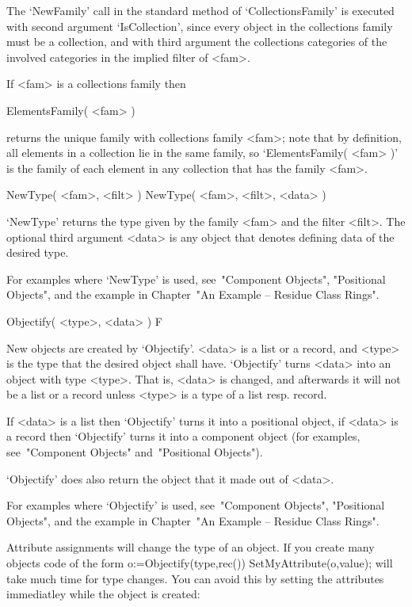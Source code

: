 The `NewFamily' call in the standard method of `CollectionsFamily'
is executed with second argument `IsCollection',
since every object in the collections family must be a collection,
and with third argument the collections categories of the involved
categories in the implied filter of <fam>.

If <fam> is a collections family then

\>ElementsFamily( <fam> )

returns the unique family with collections family <fam>;
note that by definition,
all elements in a collection lie in the same family,
so `ElementsFamily( <fam> )' is the family of each element
in any collection that has the family <fam>.



\>NewType( <fam>, <filt> )
\)NewType( <fam>, <filt>, <data> )

`NewType' returns the type given by the family <fam>
and the filter <filt>.
The optional third argument <data> is any object that denotes defining
data of the desired type.

For examples where `NewType' is used, see~"Component Objects",
"Positional Objects",
and the example in Chapter~"An Example -- Residue Class Rings".



\>Objectify( <type>, <data> ) F

New objects are created by `Objectify'.
<data> is a list or a record, and <type> is the type that the desired
object shall have.
`Objectify' turns <data> into an object with type <type>.
That is, <data> is changed, and afterwards it will not be a list or a
record unless <type> is a type of a list resp. record.

If <data> is a list then `Objectify' turns it into a positional object,
if <data> is a record then `Objectify' turns it into a component object
(for examples, see~"Component Objects" and~"Positional Objects").

`Objectify' does also return the object that it made out of <data>.

For examples where `Objectify' is used, see~"Component Objects",
"Positional Objects",
and the example in Chapter~"An Example -- Residue Class Rings".

Attribute assignments will change the type of an object. If you create many
objects code of the form
\begintt
o:=Objectify(type,rec())
SetMyAttribute(o,value);
\endtt
will take much time for type changes. You can avoid this by setting the
attributes immediatley while the object is created:

